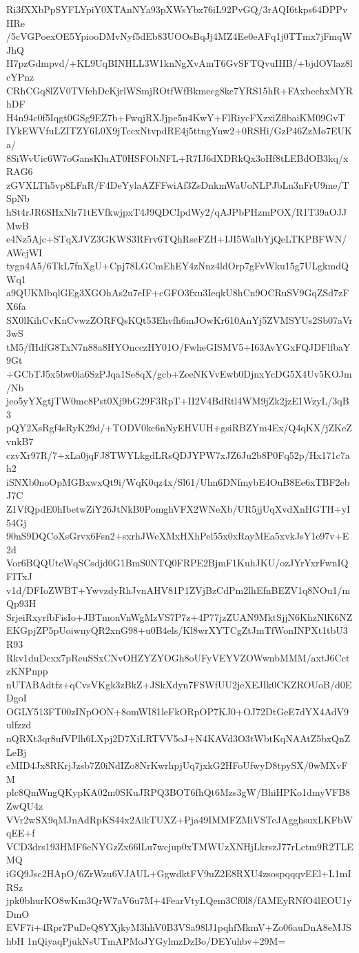 Ri3fXXbPpSYFLYpiY0XTAnNYa93pXWsYbx76iL92PvGQ/3rAQI6tkps64DPPvHRe
/5cVGPoexOE5YpiooDMvNyf5dEb83UOOsBqJj4MZ4Ee0eAFq1j0TTmx7jFmqWJhQ
H7pzGdmpvd/+KL9UqBINHLL3W1knNgXvAmT6GvSFTQvuIHB/+bjdOVlaz8lcYPnz
CRhCGq8lZV0TVfehDcKjrlWSmjROtfWfBkmecg8kc7YRS15hR+FAxbechxMYRhDF
H4n94c0f5Iqgt0GSg9EZ7b+FwqjRXJjpe5n4KwY+FlRiycFXzxiZflbaiKM09GvT
IYkEWVfuLZITZY6L0X9jTccxNtvpdRE4j5ttngYnw2+0RSHi/GzP46ZzMo7EUKa/
8SiWvUic6W7oGansKluAT0HSFObNFL+R7IJ6dXDRkQx3oHf8tLEBdOB3kq/xRAG6
zGVXLTh5vp8LFnR/F4DeYylaAZFFwiAf3ZsDnkmWaUoNLPJbLn3nFrU9me/TSpNb
hSt4rJR6SHxNlr71tEVfkwjpxT4J9QDCIpdWy2/qAJPbPHzmPOX/R1T39aOJJMwB
e4Nz5Ajc+STqXJVZ3GKWS3RFrv6TQhRseFZH+IJI5WalbYjQeLTKPBFWN/AWcjWI
tygn4A5/6TkL7fnXgU+Cpj78LGCmEhEY4zNnz4ldOrp7gFvWku15g7ULgkmdQWq1
a9QUKMbqlGEg3XGOhAs2u7eIF+cGFO3fxu3IeqkU8hCn9OCRuSV9GqZSd7zFX6fa
SX0lKihCvKnCvwzZORFQsKQt53Ehvfh6mJOwKr610AnYj5ZVMSYUs2Sb07aVr3wS
tM5/fHdfG8TxN7n88a8HYOncczHY01O/FwheGISMV5+I63AvYGxFQJDFlfbaY9Gt
+GCbTJ5x5bw0ia6SzPJqa1Se8qX/gcb+ZeeNKVvEwb0DjnxYcDG5X4Uv5KOJm/Nb
jeo5yYXgtjTW0mc8Pst0Xj9bG29F3RpT+II2V4BdRtl4WM9jZk2jzE1WzyL/3qB3
pQY2XsRgf4sRyK29d/+TODV0kc6nNyEHVUH+gsiRBZYm4Ex/Q4qKX/jZKeZvnkB7
czvXr97R/7+xLa0jqFJ8TWYLkgdLRsQDJYPW7xJZ6Ju2b8P0Fq52p/Hx171c7ah2
iSNXb0noOpMGBxwxQt9i/WqK0qz4x/Sl61/Uhn6DNfmybE4OuB8Ee6xTBF2ebJ7C
Z1VfQpdE0hIbetwZiY26JtNkB0PomghVFX2WNeXb/UR5jjUqXvdXnHGTH+yI54Gj
90nS9DQCoXsGrvx6Fsn2+sxrhJWeXMxHXhPel55x0xRayMEa5xvkJsY1e97v+E2d
Vor6BQQUteWqSCsdjd0G1BmS0NTQ0FRPE2BjmF1KuhJKU/ozJYrYxrFwnIQFITxJ
v1d/DFIoZWBT+YwvzdyRhJvnAHV81P1ZVjBzCdPm2lhEfnBEZV1q8NOu1/mQp93H
SrjeiRxyrfbFisIo+JBTmonVnWgMzVS7P7z+4P77jzZUAN9MktSjjN6KhzNlK6NZ
EKGpjZP5pUoiwnyQR2xnG98+u0B4els/Kl8wrXYTCgZtJmTfWonINPXt1tbU3R93
Rkv1duDcxx7pReuSSxCNvOHZYZYOGh8oUFyVEYVZOWwnbMMM/axtJ6CctzKNPnpp
nUTABAdtfz+qCvsVKgk3zBkZ+JSkXdyn7FSWfUU2jeXEJIk0CKZROUoB/d0EDgoI
OGLY513FT00zINpOON+8omWI81leFkORpOP7KJ0+OJ72DtGeE7dYX4AdV9ulfzzd
nQRXt3qr8ufVPlh6LXpj2D7XiLRTVV5oJ+N4KAVd3O3tWbtKqNAAtZ5bxQnZLeBj
cMID4Jx8RKrjJzsb7Z0iNdIZo8NrKwrhpjUq7jxkG2HFoUfwyD8tpySX/0wMXvFM
plc8QmWngQKypKA02m0SKuJRPQ3BOT6fhQt6Mzs3gW/BhiHPKo1dmyVFB8ZwQU4z
VVr2wSX9qMJnAdRpKS44x2AikTUXZ+Pja49IMMFZMiVSTeJAgghsuxLKFbWqEE+f
VCD3drs193HMF6eNYGzZx66lLu7wcjup0xTMWUzXNHjLkrszJ77rLctm9R2TLEMQ
iGQ9Jsc2HApO/6ZrWzu6VJAUL+GgwdktFV9uZ2E8RXU4zsospqqqvEEl+L1mIRSz
jpk0bhurKO8wKm3QrW7aV6u7M+4FearVtyLQem3Cf0l8/fAMEyRNfO4lEOU1yDmO
EVF7i+4Rpr7PuDeQ8YXjkyM3hhV0B3VSa98lJ1pqhfMkmV+Zo06auDnA8eMJShbH
1nQiyaqPjukNsUTmAPMoJYGylmzDzBo/DEYuhbv+29M=
